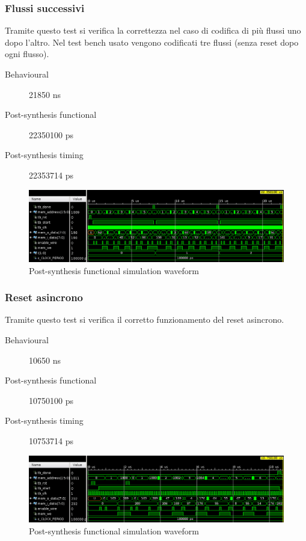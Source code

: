 \documentclass{article}
\begin{document}
\subsubsection{Flussi successivi}
Tramite questo test si verifica la correttezza  nel caso di codifica di più flussi uno dopo l'altro. Nel test bench usato vengono codificati tre flussi (senza reset dopo ogni flusso).
\begin{description}
	\item[Behavioural] 21850 ns
	\item[Post-synthesis functional] 22350100 ps
	\item[Post-synthesis timing] 22353714 ps
\end{description}
\begin{figure}[H]
	\centering
	\includegraphics[width=1\textwidth]{Assets/tb1.png}
	\caption{Post-synthesis functional simulation waveform}
\end{figure}

\subsubsection{Reset asincrono}
Tramite questo test si verifica il corretto funzionamento del reset asincrono.
\begin{description}
	\item[Behavioural] 10650 ns
	\item[Post-synthesis functional] 10750100 ps
	\item[Post-synthesis timing] 10753714 ps
\end{description}
\begin{figure}[!htb]
	\centering
	\includegraphics[width=1\textwidth]{Assets/tb2.png}
	\caption{Post-synthesis functional simulation waveform}
\end{figure}
\end{document}
